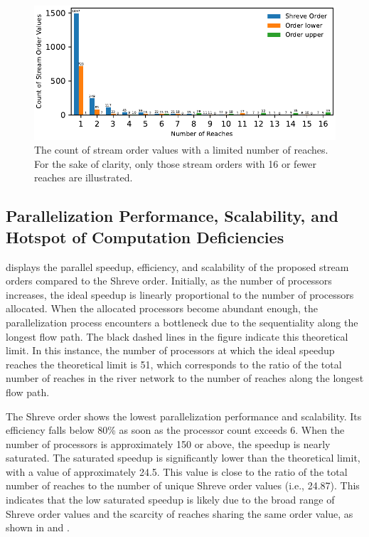 \documentclass[water,article,submit,pdftex,moreauthors]{Definitions/mdpi}
\begin{document}
\begin{figure}[H]
	\includegraphics[width=13.5 cm]{fig/stream_count_yangtze.pdf}
	\caption{The count of stream order values with a limited number of reaches. For the sake of clarity, only those stream orders with 16 or fewer reaches are illustrated. \label{fig:cumulative_count_yangtze}}
\end{figure}

\subsection{Parallelization Performance, Scalability, and Hotspot of Computation Deficiencies}
\label{sec:parallelization_yangtze}

 displays the parallel speedup, efficiency, and scalability of the proposed stream orders compared to the Shreve order. Initially, as the number of processors increases, the ideal speedup is linearly proportional to the number of processors allocated. When the allocated processors become abundant enough, the parallelization process encounters a bottleneck due to the sequentiality along the longest flow path. The black dashed lines in the figure indicate this theoretical limit. In this instance, the number of processors at which the ideal speedup reaches the theoretical limit is 51, which corresponds to the ratio of the total number of reaches in the river network to the number of reaches along the longest flow path.

The Shreve order shows the lowest parallelization performance and scalability. Its efficiency falls below 80\% as soon as the processor count exceeds 6. When the number of processors is approximately 150 or above, the speedup is nearly saturated. The saturated speedup is significantly lower than the theoretical limit, with a value of approximately 24.5. This value is close to the ratio of the total number of reaches to the number of unique Shreve order values (i.e., 24.87). This indicates that the low saturated speedup is likely due to the broad range of Shreve order values and the scarcity of reaches sharing the same order value, as shown in  and .
\end{document}

